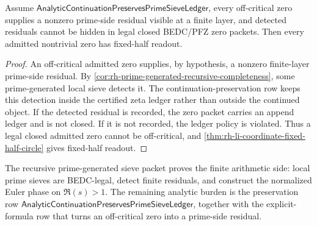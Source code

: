 \begin{theorem}
\label{thm:rh-prime-generated-recursive-sieve-conditional-fixed-half-route}
Assume $\mathsf{AnalyticContinuationPreservesPrimeSieveLedger}$, every
off-critical zero supplies a nonzero prime-side residual visible at a
finite layer, and detected residuals cannot be hidden in legal closed
BEDC/PFZ zero packets.  Then every admitted nontrivial zero has
fixed-half readout.
\end{theorem}

\begin{proof}
An off-critical admitted zero supplies, by hypothesis, a nonzero
finite-layer prime-side residual.  By
\autoref{cor:rh-prime-generated-recursive-completeness}, some
prime-generated local sieve detects it.  The continuation-preservation
row keeps this detection inside the certified zeta ledger rather than
outside the continued object.  If the detected residual is recorded, the
zero packet carries an append ledger and is not closed.  If it is not
recorded, the ledger policy is violated.  Thus a legal closed admitted
zero cannot be off-critical, and
\autoref{thm:rh-li-coordinate-fixed-half-circle} gives fixed-half
readout.
\end{proof}

\begin{principle}
\label{prin:rh-prime-generated-recursive-sieve-audit-boundary}
The recursive prime-generated sieve packet proves the finite arithmetic
side: local prime sieves are BEDC-legal, detect finite residuals, and
construct the normalized Euler phase on $\Re(s)>1$.  The remaining
analytic burden is the preservation row
$\mathsf{AnalyticContinuationPreservesPrimeSieveLedger}$, together with
the explicit-formula row that turns an off-critical zero into a
prime-side residual.
\end{principle}
